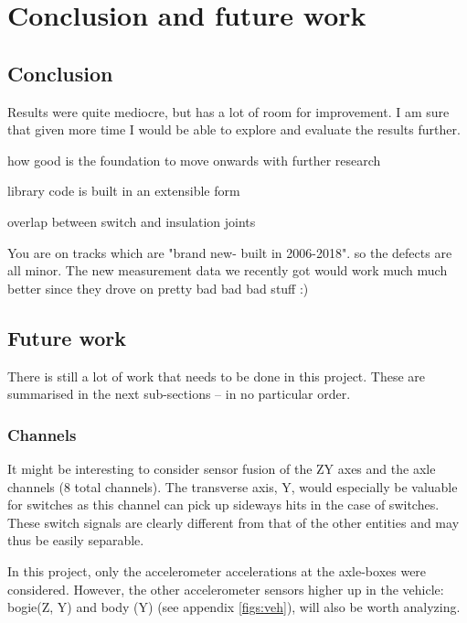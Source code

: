 \chapter{Conclusion and future work}

\section{Conclusion}
Results were quite mediocre, but has a lot of room for improvement. I am sure that given more time I would be able to explore and evaluate the results further.

how good is the foundation to move onwards with further research

library code is built in an extensible form

overlap between switch and insulation joints

You are on tracks which are "brand new- built in 2006-2018".  so the defects are all minor. The new measurement data we recently got would work much much better since they drove on pretty bad bad bad stuff :)

\section{Future work}
There is still a lot of work that needs to be done in this project. These are summarised in the next sub-sections -- in no particular order. 

\subsection{Channels}
It might be interesting to consider sensor fusion of the ZY axes and the axle channels (8 total channels). The transverse axis, Y, would especially be valuable for switches as this channel can pick up sideways hits in the case of switches. These switch signals are clearly different from that of the other entities and may thus be easily separable.
	
In this project, only the accelerometer accelerations at the axle-boxes were considered. However, the other accelerometer sensors higher up in the vehicle: bogie(Z, Y) and body (Y) (see appendix \ref{figs:veh}), will also be worth analyzing.

